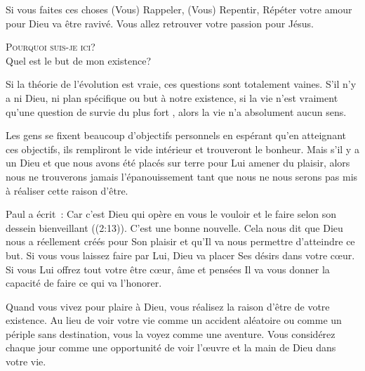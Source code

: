 Si vous faites ces choses
 \ocadr (Vous) Rappeler, (Vous) Repentir, Répéter \fcadr{}
 votre amour pour Dieu va être ravivé.
 Vous allez retrouver votre passion pour Jésus. 

\dvrule






\lettrine{P}{ourquoi suis-je ici?}\\
 Quel est le but de mon existence?

Si la théorie de l'évolution est vraie, ces questions sont totalement vaines.
 S'il n'y a ni Dieu, ni plan spécifique ou but à notre existence,
 si la vie n'est vraiment qu'une question de \og survie du plus fort \fg{},
 alors la vie n'a absolument aucun sens. 

Les gens se fixent beaucoup d'objectifs personnels en espérant
 qu'en atteignant ces objectifs, ils rempliront le vide intérieur
 et trouveront le bonheur. Mais s'il y a un Dieu et que nous avons
 été placés sur terre pour Lui amener du plaisir,
 alors nous ne trouverons jamais l'épanouissement
 tant que nous ne nous serons pas mis à réaliser cette raison d'être. 


Paul a écrit~: 
 \og Car c'est Dieu qui opère en vous le vouloir et le faire
 selon son dessein bienveillant \fg{} ((2:13)).
 C'est une bonne nouvelle. Cela nous dit que Dieu nous a réellement
 créés pour Son plaisir \ocadr et qu'Il va nous permettre d'atteindre ce but.
 Si vous vous laissez faire par Lui, Dieu va placer Ses désirs
 dans votre cœur. Si vous Lui offrez tout votre être
 \ocadr cœur, âme et pensées \fcadr{} Il va vous donner la capacité
 de faire ce qui va l'honorer. 

Quand vous vivez pour plaire à Dieu, vous réalisez la raison d'être
 de votre existence. Au lieu de voir votre vie comme un accident aléatoire
 ou comme un périple sans destination, vous la voyez comme une aventure.
 Vous considérez chaque jour comme une opportunité de voir l'œuvre
 et la main de Dieu dans votre vie. 

